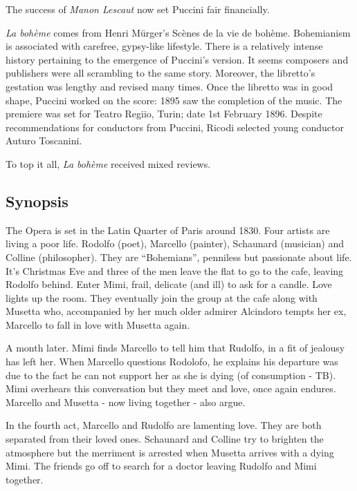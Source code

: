 The success of \textit{Manon Lescaut} now set Puccini fair financially. 

\textit{La boh\`eme} comes from Henri M\"urger's Sc\`enes de la vie de boh\`eme. Bohemianism is associated with carefree, gypsy-like lifestyle. There is a relatively intense history pertaining to the emergence of Puccini's version. It seems composers and publishers were all scrambling to the same story. Moreover, the libretto's gestation was lengthy and revised many times. Once the libretto was in good shape, Puccini worked on the score: 1895 saw the completion of the music. The premiere was set for Teatro Regiio, Turin; date 1st February 1896. Despite recommendations for conductors from Puccini, Ricodi selected young conductor Auturo Toscanini.

To top it all, \textit{La boh\`eme} received mixed reviews. 

\subsection{Synopsis}
The Opera is set in the Latin Quarter of Paris around 1830. Four artists are living a poor life. Rodolfo (poet), Marcello (painter), Schaunard (musician) and Colline (philosopher). They are ``Bohemians'', penniless but passionate about life. It's Christmas Eve and three of the men leave the flat to go to the cafe, leaving Rodolfo behind. Enter Mimi, frail, delicate (and ill) to ask for a candle. Love lights up the room. They eventually join the group at the cafe along with Musetta who, accompanied by her much older admirer Alcindoro tempts her ex, Marcello to fall in love with Musetta again. 

A month later. Mimi finds Marcello to tell him that Rudolfo, in a fit of jealousy has left her. When Marcello questions Rodolofo, he explains his departure was due to the fact he can not support her as she is dying (of consumption - TB). Mimi overhears this conversation but they meet and love, once again endures. Marcello and Musetta - now living together - also argue. 

In the fourth act, Marcello and Rudolfo are lamenting love. They are both separated from their loved ones. Schaunard and Colline try to brighten the atmosphere but the merriment is arrested when Musetta arrives with a dying Mimi. The friends go off to search for a doctor leaving Rudolfo and Mimi together. 

